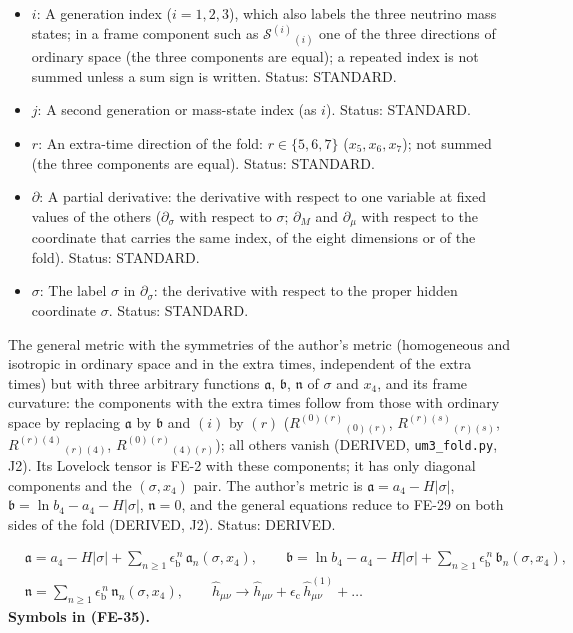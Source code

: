 \documentclass[
  10pt,
]{article}
\begin{document}
\begin{itemize}
  \(R^{(a)(b)}{}_{(c)(d)}\) its frame components,
  \(R^{(a)(b)}{}_{(a)(b)}\) (no sum) the sectional curvature of the
  frame plane \((a, b)\). Unit: 1/length\(^2\). Status: STANDARD.
\item
  \(i\): A generation index (\(i = 1, 2, 3\)), which also labels the
  three neutrino mass states; in a frame component such as
  \(\mathcal{S}^{(i)}{}_{(i)}\) one of the three directions of ordinary
  space (the three components are equal); a repeated index is not summed
  unless a sum sign is written. Status: STANDARD.
\item
  \(j\): A second generation or mass-state index (as \(i\)). Status:
  STANDARD.
\item
  \(r\): An extra-time direction of the fold: \(r \in \{5, 6, 7\}\)
  (\(x_5, x_6, x_7\)); not summed (the three components are equal).
  Status: STANDARD.
\item
  \(\partial\): A partial derivative: the derivative with respect to one
  variable at fixed values of the others (\(\partial_\sigma\) with
  respect to \(\sigma\); \(\partial_M\) and \(\partial_\mu\) with
  respect to the coordinate that carries the same index, of the eight
  dimensions or of the fold). Status: STANDARD.
\item
  \(\sigma\): The label \(\sigma\) in \(\partial_\sigma\): the
  derivative with respect to the proper hidden coordinate \(\sigma\).
  Status: STANDARD.
\end{itemize}

The general metric with the symmetries of the author's metric
(homogeneous and isotropic in ordinary space and in the extra times,
independent of the extra times) but with three arbitrary functions
\(\mathfrak{a}\), \(\mathfrak{b}\), \(\mathfrak{n}\) of \(\sigma\) and
\(x_4\), and its frame curvature: the components with the extra times
follow from those with ordinary space by replacing \(\mathfrak{a}\) by
\(\mathfrak{b}\) and \((i)\) by \((r)\) (\(R^{(0)(r)}{}_{(0)(r)}\),
\(R^{(r)(s)}{}_{(r)(s)}\), \(R^{(r)(4)}{}_{(r)(4)}\),
\(R^{(0)(r)}{}_{(4)(r)}\)); all others vanish (DERIVED,
\texttt{um3\_fold.py}, J2). Its Lovelock tensor is FE-2 with these
components; it has only diagonal components and the \((\sigma, x_4)\)
pair. The author's metric is
\(\mathfrak{a} = a_4 - H\lvert\sigma\rvert\),
\(\mathfrak{b} = \ln b_4 - a_4 - H\lvert\sigma\rvert\),
\(\mathfrak{n} = 0\), and the general equations reduce to FE-29 on both
sides of the fold (DERIVED, J2). Status: DERIVED.

\[
\begin{aligned}
&\mathfrak{a} = a_4 - H\lvert\sigma\rvert + \sum_{n\ge1}\epsilon_{\mathrm{b}}^{\,n}\,\mathfrak{a}_n(\sigma, x_4),\qquad
 \mathfrak{b} = \ln b_4 - a_4 - H\lvert\sigma\rvert + \sum_{n\ge1}\epsilon_{\mathrm{b}}^{\,n}\,\mathfrak{b}_n(\sigma, x_4),\\
&\mathfrak{n} = \sum_{n\ge1}\epsilon_{\mathrm{b}}^{\,n}\,\mathfrak{n}_n(\sigma, x_4),\qquad
 \hat h_{\mu\nu} \to \hat h_{\mu\nu} + \epsilon_{\mathrm{c}}\,\hat h^{(1)}_{\mu\nu} + \dots
\end{aligned} \tag{FE-35}
\] \textbf{Symbols in (FE-35).}
\end{document}

